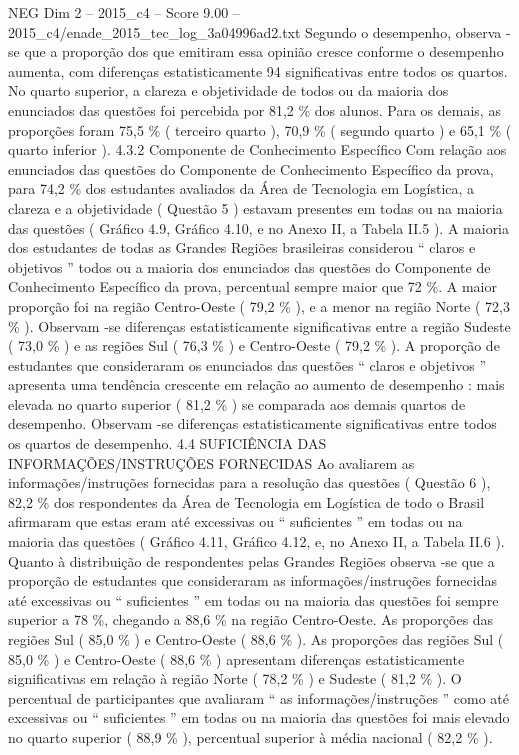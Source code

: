 \begin{textsample}{NEG Dim 2 – 2015\_c4 – Score 9.00 – 2015\_c4/enade\_2015\_tec\_log\_3a04996ad2.txt}
Segundo o desempenho, observa -se que a proporção dos que emitiram essa opinião cresce conforme o desempenho aumenta, com diferenças estatisticamente 94 significativas entre todos os quartos.
No quarto superior, a clareza e objetividade de todos ou da maioria dos enunciados das questões foi percebida por 81,2 \% dos alunos.
Para os demais, as proporções foram 75,5 \% ( terceiro quarto ), 70,9 \% ( segundo quarto ) e 65,1 \% ( quarto inferior ). 4.3.2 Componente de Conhecimento Específico Com relação aos enunciados das questões do Componente de Conhecimento Específico da prova, para 74,2 \% dos estudantes avaliados da Área de Tecnologia em Logística, a clareza e a objetividade ( Questão 5 ) estavam presentes em todas ou na maioria das questões ( Gráfico 4.9, Gráfico 4.10, e no Anexo II, a Tabela II.5 ).
A maioria dos estudantes de todas as Grandes Regiões brasileiras considerou “ claros e objetivos ” todos ou a maioria dos enunciados das questões do Componente de Conhecimento Específico da prova, percentual sempre maior que 72 \%.
A maior proporção foi na região Centro-Oeste ( 79,2 \% ), e a menor na região Norte ( 72,3 \% ).
Observam -se diferenças estatisticamente significativas entre a região Sudeste ( 73,0 \% ) e as regiões Sul ( 76,3 \% ) e Centro-Oeste ( 79,2 \% ).
A proporção de estudantes que consideraram os enunciados das questões “ claros e objetivos ” apresenta uma tendência crescente em relação ao aumento de desempenho : mais elevada no quarto superior ( 81,2 \% ) se comparada aos demais quartos de desempenho.
Observam -se diferenças estatisticamente significativas entre todos os quartos de desempenho. 4.4 SUFICIÊNCIA DAS INFORMAÇÕES/INSTRUÇÕES FORNECIDAS Ao avaliarem as informações/instruções fornecidas para a resolução das questões ( Questão 6 ), 82,2 \% dos respondentes da Área de Tecnologia em Logística de todo o Brasil afirmaram que estas eram até excessivas ou “ suficientes ” em todas ou na maioria das questões ( Gráfico 4.11, Gráfico 4.12, e, no Anexo II, a Tabela II.6 ).
Quanto à distribuição de respondentes pelas Grandes Regiões observa -se que a proporção de estudantes que consideraram as informações/instruções fornecidas até excessivas ou “ suficientes ” em todas ou na maioria das questões foi sempre superior a 78 \%, chegando a 88,6 \% na região Centro-Oeste.
As proporções das regiões Sul ( 85,0 \% ) e Centro-Oeste ( 88,6 \% ).
As proporções das regiões Sul ( 85,0 \% ) e Centro-Oeste ( 88,6 \% ) apresentam diferenças estatisticamente significativas em relação à região Norte ( 78,2 \% ) e Sudeste ( 81,2 \% ).
O percentual de participantes que avaliaram “ as informações/instruções ” como até excessivas ou “ suficientes ” em todas ou na maioria das questões foi mais elevado no quarto superior ( 88,9 \% ), percentual superior à média nacional ( 82,2 \% ).

\end{textsample}
